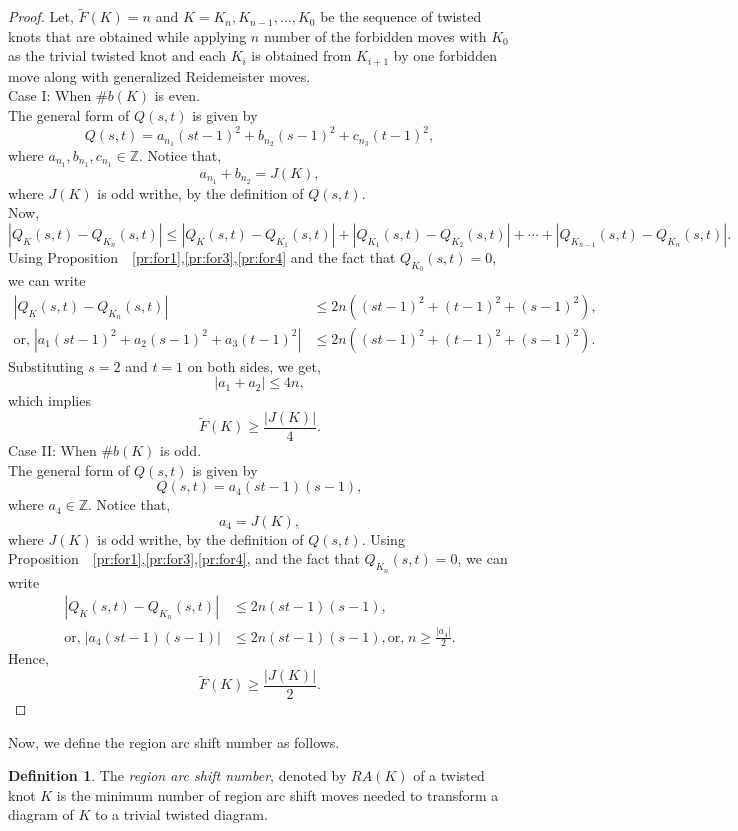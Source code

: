 \documentclass[10pt,a4paper,reqno]{amsart}
\theoremstyle{definition}
\newtheorem{definition}{Definition}[section]
\theoremstyle{remark}
\begin{document}
	\begin{proof}
		Let, $\tilde{F}(K)=n$ and $K=K_{n}, K_{n-1}, \dots ,K_{0}$ be the sequence of twisted knots that are obtained while applying $n$ number of the forbidden moves with $K_0$ as the trivial twisted knot and each $K_i$ is obtained from $K_{i+1}$ by one forbidden move along with generalized Reidemeister moves.\\
		Case I: When $\#b(K)$ is even.\\
		The general form of $Q(s,t)$ is given by
		$$Q(s,t)=  a_{n_{1}} (st-1)^2 +  b_{n_{2}} (s-1)^2 +  c_{n_{3}} (t-1)^2,$$
		where $a_{n_{1}}, b_{n_{1}},c_{n_{1}} \in \mathbb{Z} $. Notice that, \[a_{n_{1}} +  b_{n_{2}} = J(K),\] where $J(K)$ is odd writhe, by the definition of $Q(s,t)$.\\
		Now, \begin{equation*}
			|Q_{K}(s,t)-Q_{K_n}(s,t)| \leq |Q_{K}(s,t)-Q_{K_1}(s,t)|+ |Q_{K_1}(s,t)-Q_{K_2}(s,t)|+\cdots+ |Q_{K_{n-1}}(s,t)-Q_{K_n}(s,t)|.
		\end{equation*}
		Using Proposition~~\ref{pr:for1},\ref{pr:for3},\ref{pr:for4} and the fact that $Q_{K_{0}}(s,t)=0$, we can write
		\begin{align*}
			|Q_{K}(s,t)-Q_{K_n}(s,t)| &\leq 2n ( (st-1)^{2}+(t-1)^{2}+(s-1)^{2}),\\
			\text{or,}\; |a_1 (st-1)^2 +  a_2 (s-1)^2 + a_3 (t-1)^2| &\leq 2n ( (st-1)^{2}+(t-1)^{2}+(s-1)^{2}).
		\end{align*}
		Substituting $s=2$ and $t=1$ on both sides, we get,
		$$|a_1 + a_2 |\leq 4n,$$
		which implies
		\[\tilde{F}(K) \geq \frac{|J(K)|}{4}.\]
		\noindent
		Case II: When $\#b(K)$ is odd.\\
		The general form of $Q(s,t)$ is given by
		$$Q(s,t)=  a_4 (st-1)(s-1), $$
		where $a_4 \in \mathbb{Z} $. Notice that, \[a_4 = J(K),\] where $J(K)$ is odd writhe, by the definition of $Q(s,t)$.
		Using Proposition~~\ref{pr:for1},\ref{pr:for3},\ref{pr:for4},  and the fact that $Q_{K_{n}}(s,t)=0$, we can write
		\begin{align*}
			|Q_{K}(s,t)-Q_{K_n}(s,t)| &\leq 2n (st-1)(s-1),\\
			\text{or,}\; |a_4 (st-1)(s-1)| &\leq 2n (st-1)(s-1),
			\text{or,}\; n \geq \frac{|a_4|}{2}.
		\end{align*}
		Hence,
		\[\tilde{F}(K) \geq \frac{|J(K)|}{2}.\]
		
	\end{proof}
	Now, we define  the region arc shift number as follows.
	\begin{definition}
		The {\it region arc shift number}, denoted by $ RA(K)$ of  a twisted knot $K$ is the minimum number of region arc shift moves needed to transform a diagram of $K$ to a trivial twisted diagram.
		
	\end{definition}
\end{document}
